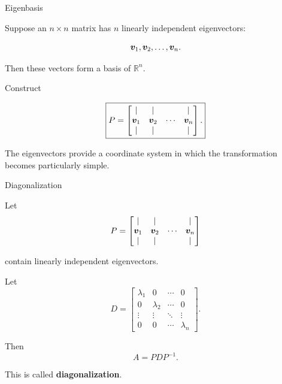 \begin{frame}{Eigenbasis}

Suppose an $n\times n$ matrix has $n$ linearly independent
eigenvectors:

\[
\bm{v}_1,\bm{v}_2,\ldots,\bm{v}_n.
\]

Then these vectors form a basis of $\mathbb{R}^n$.

Construct

\[
\boxed{
P=
\begin{bmatrix}
|&|&&|\\
\bm{v}_1&\bm{v}_2&\cdots&\bm{v}_n\\
|&|&&|
\end{bmatrix}.
}
\]

The eigenvectors provide a coordinate system in which
the transformation becomes particularly simple.

\end{frame}



\begin{frame}{Diagonalization}

Let
\vspace{-0.1cm}
\[
P=
\begin{bmatrix}
|&|&&|\\
\bm{v}_1&\bm{v}_2&\cdots&\bm{v}_n\\
|&|&&|
\end{bmatrix}
\]

contain linearly independent eigenvectors.

Let
\vspace{-0.1cm}
\[
D=
\begin{bmatrix}
\lambda_1&0&\cdots&0\\
0&\lambda_2&\cdots&0\\
\vdots&\vdots&\ddots&\vdots\\
0&0&\cdots&\lambda_n
\end{bmatrix}.
\]

Then
\vspace{-0.1cm}
\[
\boxed{
A=PDP^{-1}.
}
\]

This is called \textbf{diagonalization}.

\end{frame}



